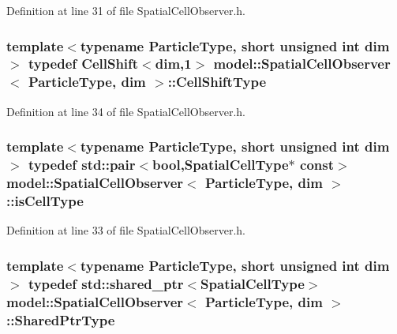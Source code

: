Definition at line 31 of file Spatial\+Cell\+Observer.\+h.

\hypertarget{structmodel_1_1_spatial_cell_observer_a5e02c4303a1bcb2dee305e5e5556f517}{}
\subsubsection[{Cell\+Shift\+Type}]{\setlength{\rightskip}{0pt plus 5cm}template$<$typename Particle\+Type, short unsigned int dim$>$ typedef {\bf Cell\+Shift}$<${\bf dim},1$>$ {\bf model\+::\+Spatial\+Cell\+Observer}$<$ Particle\+Type, {\bf dim} $>$\+::{\bf Cell\+Shift\+Type}}\label{structmodel_1_1_spatial_cell_observer_a5e02c4303a1bcb2dee305e5e5556f517}


Definition at line 34 of file Spatial\+Cell\+Observer.\+h.

\hypertarget{structmodel_1_1_spatial_cell_observer_a8308b4c6ce9d94f1f29b80a41e3374b5}{}
\subsubsection[{is\+Cell\+Type}]{\setlength{\rightskip}{0pt plus 5cm}template$<$typename Particle\+Type, short unsigned int dim$>$ typedef std\+::pair$<$bool,{\bf Spatial\+Cell\+Type}$\ast$ const$>$ {\bf model\+::\+Spatial\+Cell\+Observer}$<$ Particle\+Type, {\bf dim} $>$\+::{\bf is\+Cell\+Type}}\label{structmodel_1_1_spatial_cell_observer_a8308b4c6ce9d94f1f29b80a41e3374b5}


Definition at line 33 of file Spatial\+Cell\+Observer.\+h.

\hypertarget{structmodel_1_1_spatial_cell_observer_ae879e58433ae1725fa700b08b790b2cd}{}
\subsubsection[{Shared\+Ptr\+Type}]{\setlength{\rightskip}{0pt plus 5cm}template$<$typename Particle\+Type, short unsigned int dim$>$ typedef std\+::shared\+\_\+ptr$<${\bf Spatial\+Cell\+Type}$>$ {\bf model\+::\+Spatial\+Cell\+Observer}$<$ Particle\+Type, {\bf dim} $>$\+::{\bf Shared\+Ptr\+Type}}\label{structmodel_1_1_spatial_cell_observer_ae879e58433ae1725fa700b08b790b2cd}


